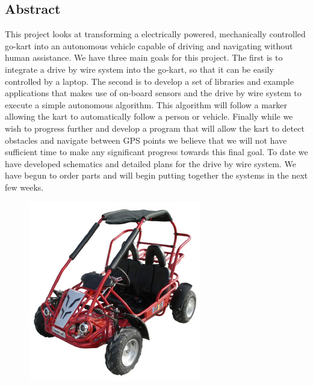 \begin{center}\section*{Abstract}\end{center}
\thispagestyle{empty}

This project looks at transforming a electrically powered, mechanically controlled go-kart into an autonomous vehicle capable of driving and navigating without human assistance. We have three main goals for this project. The first is to integrate a drive by wire system into the go-kart, so that it can be easily controlled by a laptop. The second is to develop a set of libraries and example applications that makes use of on-board sensors and the drive by wire system to execute a simple autonomous algorithm. This algorithm will follow a marker allowing the kart to automatically follow a person or vehicle. Finally while we wish to progress further and develop a program that will allow the kart to detect obstacles and navigate between GPS points we believe that we will not have sufficient time to make any significant progress towards this final goal. To date we have developed schematics and detailed plans for the drive by wire system. We have begun to order parts and will begin putting together the systems in the next few weeks.

\vfill
  \begin{figure}[h]
    \centering
    \includegraphics{../../Images/hh80h.jpg}
    \label{gokart}
  \end{figure}


